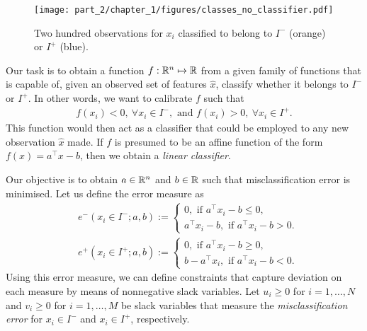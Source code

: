 \begin{figure}
    \texttt{[image: part\_2/chapter\_1/figures/classes\_no\_classifier.pdf]}
    \caption{Two hundred observations for $x_i$ classified to belong to $I^-$ (orange) or $I^+$ (blue).}        
    \label{fig:classified_observations}
\end{figure}

Our task is to obtain a function $f:\mathbb{R}^n \mapsto \mathbb{R}$ from a given family of functions that is capable of, given an observed set of features $\hat{x}$, classify whether it belongs to $I^-$ or $I^+$. In other words, we want to calibrate $f$ such that
%
\begin{align}
	f(x_i) < 0, \ \forall x_i \in I^-, \text{ and } f(x_i) > 0, \ \forall x_i \in I^+.  
\end{align}
%
This function would then act as a classifier that could be employed to any new observation $\hat{x}$ made. If $f$ is presumed to be an affine function of the form $f(x) = a^\top x - b$, then we obtain a \emph{linear classifier}. 

Our objective is to obtain $a \in \mathbb{R}^n$ and $b \in \mathbb{R}$ such that misclassification error is minimised. Let us define the error measure as
%
\begin{align*}
& e^-(x_i \in I^-; a, b) := 
    \begin{cases} 0, \text{ if } a^\top x_i - b \leq 0, \\
        a^\top x_i - b, \text{ if } a^\top x_i - b > 0.
    \end{cases} \\
& e^+(x_i \in I^+; a, b) := 
    \begin{cases} 0, \text{ if } a^\top x_i - b \geq 0, \\
        b -  a^\top x_i, \text{ if } a^\top x_i - b < 0.
    \end{cases}                   
\end{align*}
%
Using this error measure, we can define constraints that capture deviation on each measure by means of nonnegative slack variables. Let $u_i \geq 0$ for $i = 1, \dots, N$ and $v_i \geq 0$ for $i = 1,\dots, M$ be slack variables that measure the \emph{misclassification error} for $x_i \in I^-$ and $x_i \in I^+$, respectively.

